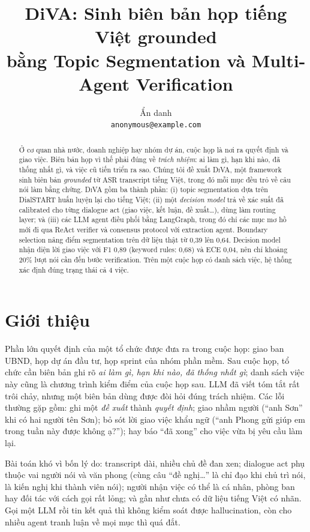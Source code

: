 \documentclass[11pt]{article}
\title{DiVA: Sinh biên bản họp tiếng Việt grounded\\
bằng Topic Segmentation và Multi-Agent Verification}
\author{Ẩn danh \\
  \texttt{anonymous@example.com}}
\newcommand{\diva}{\textsc{DiVA}}
\begin{document}
\maketitle

\begin{abstract}
Ở cơ quan nhà nước, doanh nghiệp hay nhóm dự án, cuộc họp là nơi ra quyết định và giao việc. Biên bản
họp vì thế phải đúng về \emph{trách nhiệm}: ai làm gì, hạn khi nào, đã thống nhất gì, và việc cũ tiến
triển ra sao. Chúng tôi đề xuất \diva{}, một framework sinh biên bản \emph{grounded} từ ASR transcript
tiếng Việt, trong đó mỗi mục đều trỏ về câu nói làm bằng chứng. \diva{} gồm ba thành phần: (i) topic
segmentation dựa trên DialSTART huấn luyện lại cho tiếng Việt; (ii) một \emph{decision model} trả về xác
suất đã calibrated cho từng dialogue act (giao việc, kết luận, đề xuất\ldots), dùng làm routing layer; và
(iii) các LLM agent điều phối bằng LangGraph, trong đó chỉ các mục mơ hồ mới đi qua ReAct verifier và
consensus protocol với extraction agent. Boundary selection nâng điểm segmentation trên dữ liệu thật từ
0,39 lên 0,64. Decision model nhận diện lời giao việc với F1 0,89 (keyword rules: 0,68) và ECE 0,04, nên
chỉ khoảng 20\% lượt nói cần đến bước verification. Trên một cuộc họp có danh sách việc, hệ thống xác định
đúng trạng thái cả 4 việc.
\end{abstract}

\section{Giới thiệu}

Phần lớn quyết định của một tổ chức được đưa ra trong cuộc họp: giao ban UBND, họp dự án đầu tư, họp
sprint của nhóm phần mềm. Sau cuộc họp, tổ chức cần biên bản ghi rõ \emph{ai làm gì, hạn khi nào, đã thống
nhất gì}; danh sách việc này cũng là chương trình kiểm điểm của cuộc họp sau. LLM đã viết tóm tắt rất trôi
chảy, nhưng một biên bản dùng được đòi hỏi đúng trách nhiệm. Các lỗi thường gặp gồm: ghi một \emph{đề xuất}
thành \emph{quyết định}; giao nhầm người (``anh Sơn'' khi có hai người tên Sơn); bỏ sót lời giao việc khẩu
ngữ (``anh Phong gửi giúp em trong tuần này được không ạ?''); hay báo ``đã xong'' cho việc vừa bị yêu cầu
làm lại.

Bài toán khó vì bốn lý do: transcript dài, nhiều chủ đề đan xen; dialogue act phụ thuộc vai người nói và
văn phong (cùng câu ``đề nghị\ldots'' là chỉ đạo khi chủ trì nói, là kiến nghị khi thành viên nói); người
nhận việc có thể là cá nhân, phòng ban hay đối tác với cách gọi rất lỏng; và gần như chưa có dữ liệu tiếng
Việt có nhãn. Gọi một LLM rồi tin kết quả thì không kiểm soát được hallucination, còn cho nhiều agent
tranh luận về mọi mục thì quá đắt.
\end{document}
